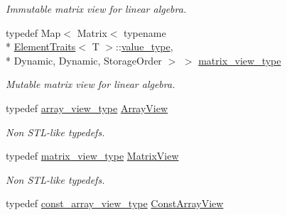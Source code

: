 \begin{DoxyCompactItemize}
\begin{DoxyCompactList}\small\item\em Immutable matrix view for linear algebra. \end{DoxyCompactList}\item 
\hypertarget{class_d_o_1_1_multi_array_a185870835281f858bc66928f6c9e1e52}{typedef Map$<$ Matrix$<$ typename \\*
\hyperlink{struct_d_o_1_1_element_traits}{Element\-Traits}$<$ T $>$\-::\hyperlink{class_d_o_1_1_multi_array_a265a253612b46abed17c61b0a5e5ce30}{value\-\_\-type}, \\*
Dynamic, Dynamic, Storage\-Order $>$ $>$ \hyperlink{class_d_o_1_1_multi_array_a185870835281f858bc66928f6c9e1e52}{matrix\-\_\-view\-\_\-type}}\label{class_d_o_1_1_multi_array_a185870835281f858bc66928f6c9e1e52}

\begin{DoxyCompactList}\small\item\em Mutable matrix view for linear algebra. \end{DoxyCompactList}\item 
\hypertarget{class_d_o_1_1_multi_array_a445d56f5d487eeb1e4d9fe4e9b3e57b4}{typedef \hyperlink{class_d_o_1_1_multi_array_a9f4b00f1ddd01a394b9e7efc47206238}{array\-\_\-view\-\_\-type} \hyperlink{class_d_o_1_1_multi_array_a445d56f5d487eeb1e4d9fe4e9b3e57b4}{Array\-View}}\label{class_d_o_1_1_multi_array_a445d56f5d487eeb1e4d9fe4e9b3e57b4}

\begin{DoxyCompactList}\small\item\em Non S\-T\-L-\/like typedefs. \end{DoxyCompactList}\item 
\hypertarget{class_d_o_1_1_multi_array_a5dfde2003ca22260d443cb6934cfc791}{typedef \hyperlink{class_d_o_1_1_multi_array_a185870835281f858bc66928f6c9e1e52}{matrix\-\_\-view\-\_\-type} \hyperlink{class_d_o_1_1_multi_array_a5dfde2003ca22260d443cb6934cfc791}{Matrix\-View}}\label{class_d_o_1_1_multi_array_a5dfde2003ca22260d443cb6934cfc791}

\begin{DoxyCompactList}\small\item\em Non S\-T\-L-\/like typedefs. \end{DoxyCompactList}\item 
\hypertarget{class_d_o_1_1_multi_array_a52eca6995c3493cf021776bb66b4d5f3}{typedef \hyperlink{class_d_o_1_1_multi_array_a4c4550c956b26060ca29852fc7752500}{const\-\_\-array\-\_\-view\-\_\-type} \hyperlink{class_d_o_1_1_multi_array_a52eca6995c3493cf021776bb66b4d5f3}{Const\-Array\-View}}\label{class_d_o_1_1_multi_array_a52eca6995c3493cf021776bb66b4d5f3}


\end{DoxyCompactItemize}
